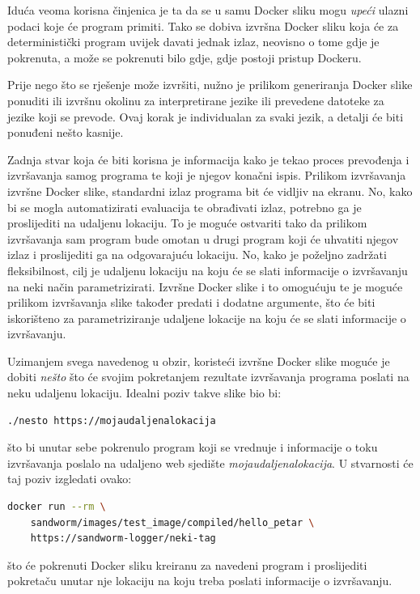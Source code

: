 \documentclass[times, utf8, zavrsni]{fer}
\begin{document}
Iduća veoma korisna činjenica je ta da se u samu Docker sliku mogu \textit{upeći} ulazni podaci koje će program primiti. Tako se dobiva izvršna Docker sliku koja će za deterministički program uvijek davati jednak izlaz, neovisno o tome gdje je pokrenuta, a može se pokrenuti bilo gdje, gdje postoji pristup Dockeru.

Prije nego što se rješenje može izvršiti, nužno je prilikom generiranja Docker slike ponuditi ili izvršnu okolinu za interpretirane jezike ili prevedene datoteke za jezike koji se prevode. Ovaj korak je individualan za svaki jezik, a detalji će biti ponuđeni nešto kasnije.

Zadnja stvar koja će biti korisna je informacija kako je tekao proces prevođenja i izvršavanja samog programa te koji je njegov konačni ispis. Prilikom izvršavanja izvršne Docker slike, standardni izlaz programa bit će vidljiv na ekranu. No, kako bi se mogla automatizirati evaluacija te obrađivati izlaz, potrebno ga je proslijediti na udaljenu lokaciju. To je moguće ostvariti tako da prilikom izvršavanja sam program bude omotan u drugi program koji će uhvatiti njegov izlaz i proslijediti ga na odgovarajuću lokaciju. No, kako je poželjno zadržati fleksibilnost, cilj je udaljenu lokaciju na koju će se slati informacije o izvršavanju na neki način parametrizirati. Izvršne Docker slike i to omogućuju te je moguće prilikom izvršavanja slike također predati i dodatne argumente, što će biti iskorišteno za parametriziranje udaljene lokacije na koju će se slati informacije o izvršavanju.

Uzimanjem svega navedenog u obzir, koristeći izvršne Docker slike moguće je dobiti \textit{nešto} što će svojim pokretanjem rezultate izvršavanja programa poslati na neku udaljenu lokaciju. Idealni poziv takve slike bio bi:

\begin{lstlisting}
./nesto https://mojaudaljenalokacija
\end{lstlisting}

što bi unutar sebe pokrenulo program koji se vrednuje i informacije o toku izvršavanja poslalo na udaljeno web sjedište {\textit{mojaudaljenalokacija}}. U stvarnosti će taj poziv izgledati ovako:

\begin{lstlisting}[language=Bash]
docker run --rm \
	sandworm/images/test_image/compiled/hello_petar \
	https://sandworm-logger/neki-tag
\end{lstlisting}

što će pokrenuti Docker sliku kreiranu za navedeni program i proslijediti pokretaču unutar nje lokaciju na koju treba poslati informacije o izvršavanju.
\end{document}
